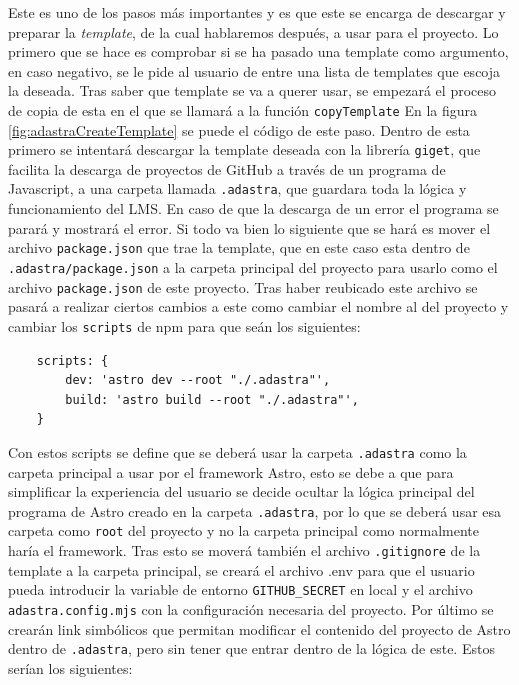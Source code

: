 Este es uno de los pasos más importantes y es que este se encarga de descargar y preparar la \textit{template}, de la cual hablaremos después, a usar para el proyecto. Lo primero que se hace es comprobar si se ha pasado una template como argumento, en caso negativo, se le pide al usuario de entre una lista de templates que escoja la deseada. Tras saber que template se va a querer usar, se empezará el proceso de copia de esta en el que se llamará a la función \verb|copyTemplate| En la figura \ref{fig:adastraCreateTemplate} se puede el código de este paso. Dentro de esta primero se intentará descargar la template deseada con la librería \verb|giget|\cite{giget}, que facilita la descarga de proyectos de GitHub a través de un programa de Javascript, a una carpeta llamada \verb|.adastra|, que guardara toda la lógica y funcionamiento del LMS. En caso de que la descarga de un error el programa se parará y mostrará el error. Si todo va bien lo siguiente que se hará es mover el archivo \verb|package.json| que trae la template, que en este caso esta dentro de \verb|.adastra/package.json| a la carpeta principal del proyecto para usarlo como el archivo \verb|package.json| de este proyecto. Tras haber reubicado este archivo se pasará a realizar ciertos cambios a este como cambiar el nombre al del proyecto y cambiar los \verb|scripts| de npm para que seán los siguientes:
\begin{verbatim}
    scripts: {
        dev: 'astro dev --root "./.adastra"',
        build: 'astro build --root "./.adastra"',
    }
\end{verbatim}
Con estos scripts se define que se deberá usar la carpeta \verb|.adastra| como la carpeta principal a usar por el framework Astro, esto se debe a que para simplificar la experiencia del usuario se decide ocultar la lógica principal del programa de Astro creado en la carpeta \verb|.adastra|, por lo que se deberá usar esa carpeta como \verb|root| del proyecto y no la carpeta principal como normalmente haría el framework. Tras esto se moverá también el archivo \verb|.gitignore| de la template a la carpeta principal, se creará el archivo .env  para que el usuario pueda introducir la variable de entorno \verb|GITHUB_SECRET| en local y el archivo \verb|adastra.config.mjs| con la configuración necesaria del proyecto. Por último se crearán link simbólicos que permitan modificar el contenido del proyecto de Astro dentro de \verb|.adastra|, pero sin tener que entrar dentro de la lógica de este. Estos serían los siguientes:

